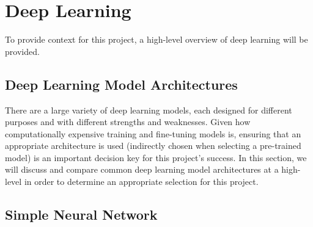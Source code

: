 
\chapter[Abbreviated title]{Deep Learning}
\label{Chap:label}	%
\pagestyle{headings}

\noindent
To provide context for this project, a high-level overview of deep learning will be provided. 



\section{Deep Learning Model Architectures}

\noindent
There are a large variety of deep learning models, each designed for different purposes and with
different strengths and weaknesses. Given how computationally expensive training and fine-tuning models is,
ensuring that an appropriate architecture is used (indirectly chosen when selecting a pre-trained model)
is an important decision key for this project's success. In this section, we will discuss and compare common
deep learning model architectures at a high-level in order to determine an appropriate selection for this project.

\section{Simple Neural Network}

